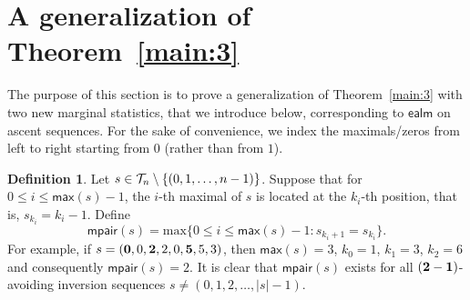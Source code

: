 \documentclass[12pt]{amsart}
\theoremstyle{plain}
\theoremstyle{definition}
\newtheorem{definition}{Definition}
\theoremstyle{example}
\theoremstyle{remark}
\numberwithin{equation}{section}
\numberwithin{figure}{section}
\def\max{\mathsf{max}}
\def\maxx{\mathrm{max}}
\def\ealm{\mathsf{ealm}}
\def\mpair{\mathsf{mpair}}
\def\T{\CMcal{T}}
\begin{document}
\section{A generalization of Theorem~\ref{main:3}}\label{sec:4}

The purpose of this section is to prove a generalization of Theorem~\ref{main:3} with two new marginal statistics,  that we introduce below, corresponding to $\ealm$ on ascent sequences. For the sake of convenience, we index the maximals/zeros from left to right starting from $0$ (rather than from $1$). 

\begin{definition}
Let $s\in \T_n\setminus\{(0,1,\ldots,n-1)\}$.  Suppose that for $0\le i\le \max(s)-1$, the $i$-th maximal of $s$ is located at the $k_{i}$-th position, that is, $s_{k_{i}}=k_{i}-1$. Define
$$
\mpair(s)=\maxx\{0\le i\le \max(s)-1: s_{k_{i}+1}=s_{k_{i}}\}.
$$
For example, if $s=({\bf0},0,{\bf2},2,0,{\bf5},5,3)$, then  $\max(s)=3$, $k_0=1$, $k_1=3$, $k_2=6$ and consequently $\mpair(s)=2$. It is clear that $\mpair(s)$ exists for all $({\bf2-1})$-avoiding inversion sequences  $s\ne (0,1,2,\ldots,|s|-1)$.
\end{definition}
\end{document}

